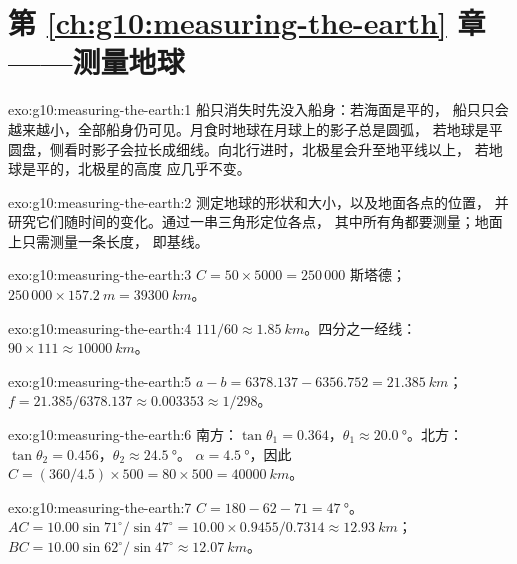 \section*{第 \ref{ch:g10:measuring-the-earth} 章——测量地球}

\begin{solution}{exo:g10:measuring-the-earth:1}
船只消失时先没入船身：若海面是平的，
船只只会越来越小，全部船身仍可见。月食时地球在月球上的影子总是圆弧，
若地球是平圆盘，侧看时影子会拉长成细线。向北行进时，北极星会升至地平线以上，
若地球是平的，北极星的高度
应几乎不变。
\end{solution}

\begin{solution}{exo:g10:measuring-the-earth:2}
测定地球的形状和大小，以及地面各点的位置，
并研究它们随时间的变化。通过一串三角形定位各点，
其中所有角都要测量；地面上只需测量一条长度，
即基线。
\end{solution}

\begin{solution}{exo:g10:measuring-the-earth:3}
$C = 50 \times 5000 = 250\,000$ 斯塔德；$250\,000 \times \qty{157.2}{m} =
\qty{39300}{km}$。
\end{solution}

\begin{solution}{exo:g10:measuring-the-earth:4}
$111/60 \approx \qty{1.85}{km}$。四分之一经线：$90 \times 111 \approx
\qty{10000}{km}$。
\end{solution}

\begin{solution}{exo:g10:measuring-the-earth:5}
$a - b = 6378.137 - 6356.752 = \qty{21.385}{km}$；
$f = 21.385/6378.137 \approx 0.003353 \approx 1/298$。
\end{solution}

\begin{solution}{exo:g10:measuring-the-earth:6}
南方：$\tan\theta_1 = 0.364$，$\theta_1 \approx \qty{20.0}{\degree}$。北方：
$\tan\theta_2 = 0.456$，$\theta_2 \approx \qty{24.5}{\degree}$。
$\alpha = \qty{4.5}{\degree}$，因此 $C = (360/4.5) \times 500 = 80 \times 500 =
\qty{40000}{km}$。
\end{solution}

\begin{solution}{exo:g10:measuring-the-earth:7}
$C = 180 - 62 - 71 = \qty{47}{\degree}$。
$AC = 10.00 \sin 71^\circ/\sin 47^\circ = 10.00 \times 0.9455/0.7314 \approx
\qty{12.93}{km}$；$BC = 10.00 \sin 62^\circ/\sin 47^\circ \approx
\qty{12.07}{km}$。
\end{solution}

